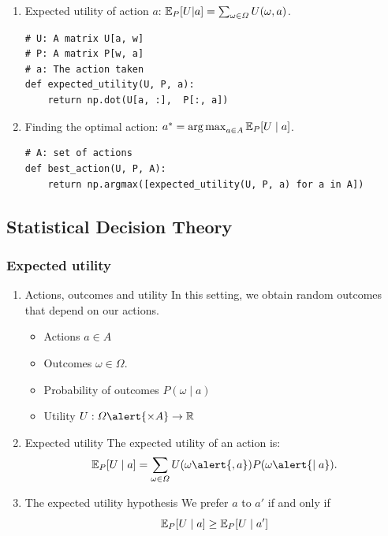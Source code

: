 \documentclass[smaller]{article}
\begin{document}
\begin{enumerate}
\item Expected utility of action \(a\): \(\mathop{\mbox{\ensuremath{\mathbb{E}}}}\nolimits_P[U |a] = \sum_{\omega \in \Omega} U(\omega, a)\).
\label{sec:org7996839}
\lstset{language=Python,label= ,caption= ,captionpos=b,numbers=none}
\begin{lstlisting}
# U: A matrix U[a, w]
# P: A matrix P[w, a]
# a: The action taken
def expected_utility(U, P, a):
	return np.dot(U[a, :],  P[:, a])
\end{lstlisting}
\item Finding the optimal action: \(a^* = \operatorname*{arg\,max}_{a \in A} \mathop{\mbox{\ensuremath{\mathbb{E}}}}\nolimits_P[U \mid a]\).
\label{sec:org9cf13bc}
\lstset{language=Python,label= ,caption= ,captionpos=b,numbers=none}
\begin{lstlisting}
# A: set of actions
def best_action(U, P, A):
	return np.argmax([expected_utility(U, P, a) for a in A])
\end{lstlisting}
\end{enumerate}

\subsection{Statistical Decision Theory}
\label{sec:orgab30b85}

\subsubsection{Expected utility}
\label{sec:orgb8acc00}
\begin{enumerate}
\item Actions, outcomes and utility
\label{sec:orgb050655}
In this setting, we obtain random outcomes that depend on our actions.
\begin{itemize}
\item Actions \(a \in A\)
\item Outcomes \(\omega \in \Omega\).
\item Probability of outcomes \(P(\omega \mid a)\)
\item Utility \(U : \Omega \alert{\times A} \to \Reals\)
\end{itemize}
\item Expected utility
\label{sec:org1c8edac}
The expected utility of an action is:
\[
\E_P[U \mid a] = \sum_{\omega \in \Omega} U(\omega \alert{, a}) P(\omega \alert{\mid a}).
\]

\item The expected utility hypothesis
\label{sec:org9ff1d85}
We prefer \(a\) to \(a'\) if and only if
\[
\mathop{\mbox{\ensuremath{\mathbb{E}}}}\nolimits_P[U \mid a] \geq \mathop{\mbox{\ensuremath{\mathbb{E}}}}\nolimits_P[U \mid a']
\]
\end{enumerate}
\end{document}
